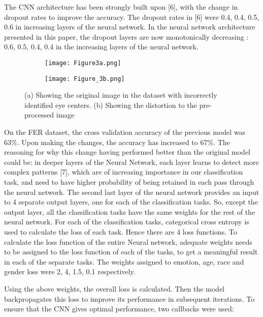 \documentclass[letterpaper,10pt]{article}
\begin{document}
The CNN architecture has been strongly built upon [6], with the change in dropout rates to improve the accuracy.
The dropout rates in [6] were 0.4, 0.4, 0.5, 0.6 in increasing layers of  the neural network. In the neural network architecture presented in this paper, the dropout layers are now monotonically decreasing : 0.6, 0.5, 0.4, 0.4 in the increasing layers of the neural network.
\begin{figure}
     \centering
     \begin{subfigure}[b]{0.3\textwidth}
         \centering
         \texttt{[image: Figure3a.png]}
         
         \caption{}
     \end{subfigure}
     \begin{subfigure}[b]{0.3\textwidth}
         \centering
         \texttt{[image: Figure\_3b.png]}
       \caption{}
     \end{subfigure}
        \caption{(a) Showing the original image in the dataset with incorrectly identified eye centers. (b) Showing the distortion to the pre-processed image
}
        
\end{figure}

On the FER dataset, the cross validation accuracy of the previous model was 63\%.
Upon making the changes, the accuracy has increased to 67\%.
The reasoning for why this change having performed better than the original model could be: in deeper layers of the Neural Network, each layer learns to detect more complex patterns [7], which are of increasing importance in our classification task, and need to  have higher probability of being retained in each pass through the neural  network.
The second last layer of the neural network provides an input to 4 separate output layers, one for each of the classification tasks.
So, except the output layer, all the classification tasks have the same weights for the rest of the neural network.
For each of the classification tasks, categorical cross entropy is used to calculate the loss of each task. Hence there are  4 loss functions. To calculate the loss function of the entire Neural network, adequate weights needs to be assigned to the loss function of each of the tasks, to get a meaningful result in each of the separate tasks. The weights assigned to emotion, age, race and gender loss were 2, 4, 1.5, 0.1 respectively.

Using the above weights, the overall loss is calculated. Then the model backpropagates this loss to improve its performance in subsequent iterations.
To ensure that the CNN gives optimal performance, two callbacks were used:
\end{document}
